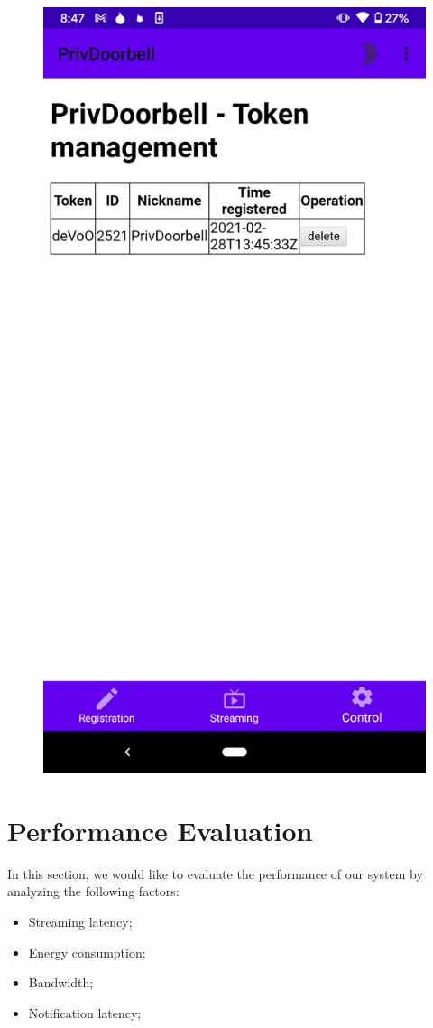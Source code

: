 \begin{figure}
\begin{minipage}[t]{0.3\linewidth}
		\includegraphics[width=\linewidth]{app_sc_token_revoke.png}
		\label{fig:app_sc_token_revoke}
	\end{minipage}	
\end{figure}


\section{Performance Evaluation}
In this section, we would like to evaluate the performance of our system by analyzing the following factors:
\begin{itemize}
	\item Streaming latency;
	\item Energy consumption;
	\item Bandwidth;
	\item Notification latency;
\end{itemize}

